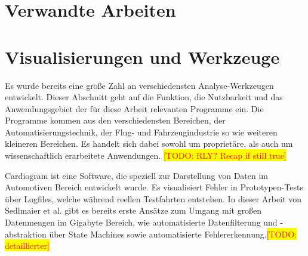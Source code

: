 \documentclass[draft=false
              ,paper=a4
              ,twoside=false
              ,fontsize=11pt
              ,headsepline
              ,BCOR10mm
              ,DIV11
              ]{scrbook}
\newcommand{\TODO}[1]{\colorbox{yellow}{\textcolor{red}{[TODO: #1]}}}
\begin{document}
\section{Verwandte Arbeiten} %
\label{sec:verwandte_arbeiten}

\section{Visualisierungen und Werkzeuge} %
\label{sec:anwendungen_und_werkzeuge}
Es wurde bereits eine große Zahl an verschiedensten Analyse-Werkzeugen entwickelt. Dieser Abschnitt geht auf die Funktion, die Nutzbarkeit und das Anwendungsgebiet der für diese Arbeit relevanten Programme ein. Die Programme kommen aus den verschiedensten Bereichen, der Automatisierungstechnik, der Flug- und Fahrzeugindustrie so wie weiteren kleineren Bereichen. Es handelt sich dabei sowohl um proprietäre, als auch um wissenschaftlich erarbeitete Anwendungen. 
\iffalse\TODO{RLY? Recap if still true} 

Cardiogram \cite{sedlmair_cardiogram:_2011} ist eine Software, die speziell zur Darstellung von Daten im Automotiven Bereich entwickelt wurde. Es visualisiert Fehler in Prototypen-Tests über Logfiles, welche während reellen Testfahrten entstehen. In dieser Arbeit von Sedlmaier et al. gibt es bereits erste Ansätze zum Umgang mit großen Datenmengen im Gigabyte Bereich, wie automatisierte Datenfilterung und -abstraktion über State Machines sowie automatisierte Fehlererkennung.\TODO{detaillierter}
\end{document}

